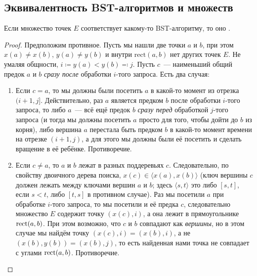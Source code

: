 
\subsection{Эквивалентность BST-алгоритмов и \arbs множеств}

\begin{theorem}\label{bst_to_arbs} Если множество точек $E$ соответствует какому-то BST-алгоритму,
	то оно \arbs.
\end{theorem}
\begin{proof} Предположим противное. Пусть мы нашли две точки $a$ и $b$, при этом
	$x(a) \neq x(b)$, $y(a) \neq y(b)$ и внутри $\mathrm{rect}(a, b)$ нет других точек $E$.
	Не умаляя общности, $i \coloneqq y(a) < y(b) \eqqcolon j$. Пусть $c$~--- наименьший общий предок $a$ и $b$ \emph{сразу после} обработки $i$-того запроса.
	Есть два случая:
	\begin{enumerate}
		\item Если $c = a$, то мы должны были посетить $a$ в какой-то момент из отрезка $(i + 1, j]$. Действительно, раз $a$ является предком $b$ после обработки $i$-того запроса, то либо $a$~--- всё ещё предок $b$ \emph{сразу перед} обработкой $j$-того запроса (и тогда мы должны посетить $a$ просто для того, чтобы дойти до $b$ из корня), либо вершина $a$ перестала быть предком $b$ в какой-то момент времени на отрезке $(i + 1, j)$, а для этого мы должны были её посетить и сделать вращение в её ребёнке. Противоречие.

		\item Если $c \neq a$, то $a$ и $b$ лежат в разных поддеревьях $c$. Следовательно, по свойству двоичного дерева поиска, $x(c) \in \langle x(a), x(b) \rangle$ (ключ вершины $c$ должен лежать между ключами вершин $a$ и $b$; здесь $\langle s, t \rangle$ это либо $[s, t]$, если $s < t$, либо $[t, s]$ в противном случае). Раз мы посетили $a$ при обработке $i$-того
		      запроса, то мы посетили и её предка $c$, следовательно множество $E$ содержит точку $(x(c), i)$, а она лежит в прямоугольнике $\operatorname{rect}(a, b)$. При этом возможно, что $c$ и $b$ совпадают как \emph{вершины}, но в этом случае мы найдём точку $(x(c), i) = (x(b), i)$, а не $(x(b), y(b)) = (x(b), j)$, то есть найденная нами точка не совпадает с углами $\operatorname{rect}(a, b)$. Противоречие.
	\end{enumerate}
\end{proof}


